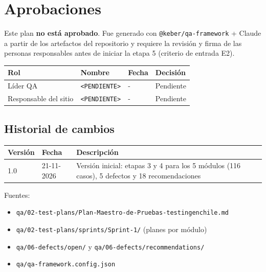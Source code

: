 \documentclass[11pt,a4paper]{article}
\begin{document}
\section{Aprobaciones}\label{sec:aprobaciones}

\begin{warnbox}
Este plan \textbf{no está aprobado}. Fue generado con \texttt{@keber/qa-framework} + Claude a partir
de los artefactos del repositorio y requiere la revisión y firma de las personas responsables antes
de iniciar la etapa 5 (criterio de entrada E2).
\end{warnbox}

\begin{table}[H]
\centering\small
\begin{tabularx}{\textwidth}{@{}l X l l@{}}
\toprule
Rol & Nombre & Fecha & Decisión \\
\midrule
Líder QA & \texttt{<PENDIENTE>} & - & Pendiente \\
Responsable del sitio & \texttt{<PENDIENTE>} & - & Pendiente \\
\bottomrule
\end{tabularx}
\end{table}

\subsection*{Historial de cambios}

\begin{table}[H]
\centering\small
\begin{tabularx}{\textwidth}{@{}l l X@{}}
\toprule
Versión & Fecha & Descripción \\
\midrule
1.0 & 21-11-2026 & Versión inicial: etapas 3 y 4 para los 5 módulos (116 casos), 5 defectos y 18 recomendaciones \\
\bottomrule
\end{tabularx}
\end{table}

\vspace{1em}
{\small\color{muted}Fuentes:
\begin{itemize}
  \item \texttt{qa/02-test-plans/Plan-Maestro-de-Pruebas-testingenchile.md}
  \item \texttt{qa/02-test-plans/sprints/Sprint-1/} (planes por módulo)
  \item \texttt{qa/06-defects/open/} y \texttt{qa/06-defects/recommendations/}
  \item \texttt{qa/qa-framework.config.json}
\end{itemize}\par}
\end{document}
